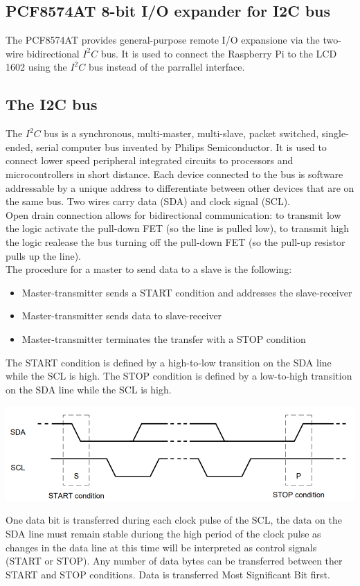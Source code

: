 \documentclass[]{article}
\begin{document}
\subsection{PCF8574AT 8-bit I/O expander for I2C bus}
The PCF8574AT provides general-purpose remote I/O expansione via the two-wire bidirectional $ I^2C $ bus. It is used to connect the Raspberry Pi to the LCD 1602
using the $ I^2 C $ bus instead of the parrallel interface.

\subsection{The I2C bus}
The $ I^2C $ bus is a synchronous, multi-master, multi-slave, packet switched, single-ended, serial computer bus invented by Philips Semiconductor.
It is used to connect lower speed peripheral integrated circuits to processors and microcontrollers in short distance. 
Each device connected to the bus is software addressable by a unique address to differentiate between other devices that are on the same bus. 
Two wires carry data (SDA) and clock signal (SCL). \\
Open drain connection allows for bidirectional communication: to transmit low the logic activate the pull-down FET (so the line is pulled low), 
to transmit high the logic realease the bus turning off the pull-down FET (so the pull-up resistor pulls up the line). \\
The procedure for a master to send data to a slave is the following: 
\begin{itemize}
    \item Master-transmitter sends a START condition and addresses the slave-receiver 
    \item Master-transmitter sends data to slave-receiver 
    \item Master-transmitter terminates the transfer with a STOP condition 
\end{itemize}
The START condition is defined by a high-to-low transition on the SDA line while the SCL is high. The STOP condition is defined by a low-to-high transition 
on the SDA line while the SCL is high.

\begin{center}
    \includegraphics[scale=0.5]{start_stop_conditions}
\end{center}
One data bit is transferred during each clock pulse of the SCL, the data on the SDA line must remain stable duriong the high period of the clock pulse
as changes in the data line at this time will be interpreted as control signals (START or STOP). Any number of data bytes can be transferred between
ther START and STOP conditions. Data is transferred Most Significant Bit first.
\end{document}
